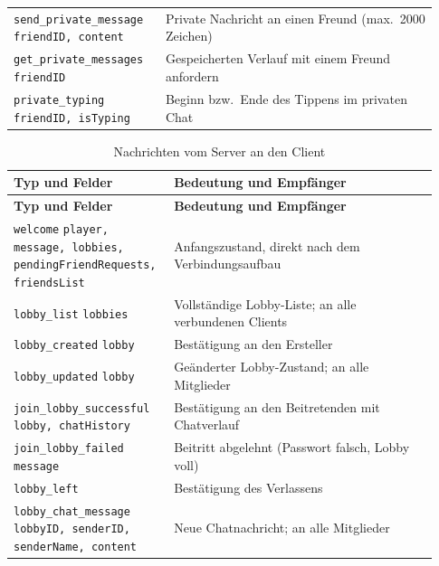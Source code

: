 {\begin{longtable}{p{0.33\linewidth}p{0.6\linewidth}}
  \texttt{send\_private\_message} \newline \texttt{friendID, content} & Private Nachricht an einen Freund (max.\ 2000 Zeichen) \\
  \texttt{get\_private\_messages} \newline \texttt{friendID} & Gespeicherten Verlauf mit einem Freund anfordern \\
  \texttt{private\_typing} \newline \texttt{friendID, isTyping} & Beginn bzw.\ Ende des Tippens im privaten Chat \\
  \bottomrule
\end{longtable}

\begin{longtable}{p{0.33\linewidth}p{0.6\linewidth}}
  \caption{Nachrichten vom Server an den Client}\label{tab:protokoll-resp}\\
  \toprule
  \textbf{Typ und Felder} & \textbf{Bedeutung und Empfänger} \\
  \midrule
  \endfirsthead
  \toprule
  \textbf{Typ und Felder} & \textbf{Bedeutung und Empfänger} \\
  \midrule
  \endhead
  \texttt{welcome} \newline \texttt{player, message, lobbies, pendingFriendRequests, friendsList} & Anfangszustand, direkt nach dem Verbindungsaufbau \\
  \texttt{lobby\_list} \newline \texttt{lobbies} & Vollständige Lobby-Liste; an alle verbundenen Clients \\
  \texttt{lobby\_created} \newline \texttt{lobby} & Bestätigung an den Ersteller \\
  \texttt{lobby\_updated} \newline \texttt{lobby} & Geänderter Lobby-Zustand; an alle Mitglieder \\
  \texttt{join\_lobby\_successful} \newline \texttt{lobby, chatHistory} & Bestätigung an den Beitretenden mit Chatverlauf \\
  \texttt{join\_lobby\_failed} \newline \texttt{message} & Beitritt abgelehnt (Passwort falsch, Lobby voll) \\
  \texttt{lobby\_left} & Bestätigung des Verlassens \\
  \texttt{lobby\_chat\_message} \newline \texttt{lobbyID, senderID, senderName, content} & Neue Chatnachricht; an alle Mitglieder \\

\end{longtable}}
